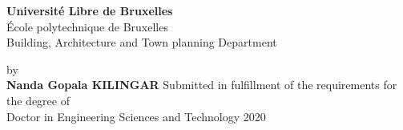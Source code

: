 \begin{titlepage}
\begin{minipage}[c]{0.7\linewidth}
\textbf{Universit\'e Libre de Bruxelles}\\
\'Ecole polytechnique de Bruxelles\\
Building, Architecture and Town planning Department
\end{minipage}\hfill
\begin{minipage}[c]{0.3\linewidth}
\end{minipage}
\vfill
\centering
\Large{\textbf{\thesistitle}}
\vfill
{by}\\
\vspace*{0.5cm}
\textbf{Nanda Gopala KILINGAR}
\vfill
\normalsize{Submitted in fulfillment of the requirements for the degree of\\
Doctor in Engineering Sciences and Technology}
\vfill
2020
\vfill
\end{titlepage}
